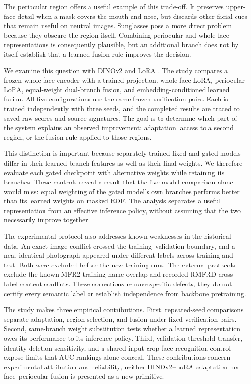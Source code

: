\documentclass[10pt,journal,compsoc]{IEEEtran}
\begin{document}
The periocular region offers a useful example of this trade-off. It preserves upper-face detail when a mask covers the mouth and nose, but discards other facial cues that remain useful on neutral images. Sunglasses pose a more direct problem because they obscure the region itself. Combining periocular and whole-face representations is consequently plausible, but an additional branch does not by itself establish that a learned fusion rule improves the decision.

We examine this question with DINOv2 \cite{dinov2} and LoRA \cite{lora}. The study compares a frozen whole-face encoder with a trained projection, whole-face LoRA, periocular LoRA, equal-weight dual-branch fusion, and embedding-conditioned learned fusion. All five configurations use the same frozen verification pairs. Each is trained independently with three seeds, and the completed results are traced to saved raw scores and source signatures. The goal is to determine which part of the system explains an observed improvement: adaptation, access to a second region, or the fusion rule applied to those regions.

This distinction is important because separately trained fixed and gated models differ in their learned branch features as well as their final weights. We therefore evaluate each gated checkpoint with alternative weights while retaining its branches. These controls reveal a result that the five-model comparison alone would miss: equal weighting of the gated model's own branches performs better than its learned weights on masked ROF. The analysis separates a useful representation from an effective inference policy, without assuming that the two necessarily improve together.

The experimental protocol also addresses known weaknesses in the historical data. An exact image conflict crossed the training--validation boundary, and a near-identical photograph appeared under different labels across training and test. Both were excluded before the new training runs. The external protocols exclude the known MFR2 training-name overlap and recorded RMFRD cross-label content conflicts. These corrections remove specific defects; they do not certify every semantic label or establish independence from backbone pretraining.

The study makes three empirical contributions. First, repeated-seed comparisons separate adaptation, region selection, and fusion under fixed verification pairs. Second, same-branch weight substitution tests whether a learned representation owes its performance to its inference policy. Third, validation-threshold transfer, identity-deletion sensitivity, and a shared-input-crop face-recognition control expose limits that AUC rankings alone conceal. These contributions concern experimental attribution and reliability; neither DINOv2--LoRA adaptation nor face--periocular fusion is presented as a new primitive.
\end{document}
